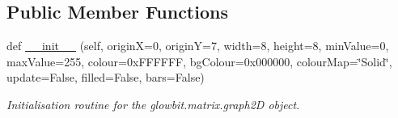 \subsection*{Public Member Functions}
\begin{DoxyCompactItemize}
\item 
def \hyperlink{classglowbit_1_1glowbitMatrix_1_1graph2D_aaf8deac85157251c95a32172f7069887}{\+\_\+\+\_\+init\+\_\+\+\_\+} (self, originX=0, originY=7, width=8, height=8, min\+Value=0, max\+Value=255, colour=0x\+F\+F\+F\+F\+F\+F, bg\+Colour=0x000000, colour\+Map=\char`\"{}\+Solid\char`\"{}, update=\+False, filled=\+False, bars=\+False)
\begin{DoxyCompactList}\small\item\em Initialisation routine for the glowbit.\+matrix.\+graph2D object. \end{DoxyCompactList}\end{DoxyCompactItemize}
